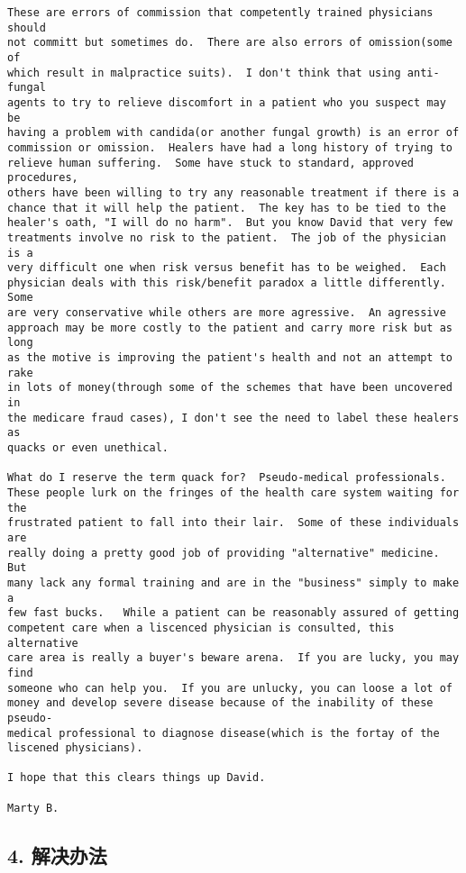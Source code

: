\documentclass[11pt]{article}
\begin{document}
\begin{verbatim}
These are errors of commission that competently trained physicians should 
not committ but sometimes do.  There are also errors of omission(some of 
which result in malpractice suits).  I don't think that using anti-fungal 
agents to try to relieve discomfort in a patient who you suspect may be 
having a problem with candida(or another fungal growth) is an error of 
commission or omission.  Healers have had a long history of trying to 
relieve human suffering.  Some have stuck to standard, approved procedures,
others have been willing to try any reasonable treatment if there is a 
chance that it will help the patient.  The key has to be tied to the 
healer's oath, "I will do no harm".  But you know David that very few 
treatments involve no risk to the patient.  The job of the physician is a 
very difficult one when risk versus benefit has to be weighed.  Each 
physician deals with this risk/benefit paradox a little differently.  Some 
are very conservative while others are more agressive.  An agressive 
approach may be more costly to the patient and carry more risk but as long 
as the motive is improving the patient's health and not an attempt to rake 
in lots of money(through some of the schemes that have been uncovered in 
the medicare fraud cases), I don't see the need to label these healers as 
quacks or even unethical.

What do I reserve the term quack for?  Pseudo-medical professionals.  
These people lurk on the fringes of the health care system waiting for the 
frustrated patient to fall into their lair.  Some of these individuals are 
really doing a pretty good job of providing "alternative" medicine.  But 
many lack any formal training and are in the "business" simply to make a 
few fast bucks.   While a patient can be reasonably assured of getting 
competent care when a liscenced physician is consulted, this alternative 
care area is really a buyer's beware arena.  If you are lucky, you may find 
someone who can help you.  If you are unlucky, you can loose a lot of 
money and develop severe disease because of the inability of these pseudo-
medical professional to diagnose disease(which is the fortay of the 
liscened physicians).

I hope that this clears things up David.

Marty B.
\end{verbatim}

    \subsection{4. 解决办法}\label{ux89e3ux51b3ux529eux6cd5}
\end{document}
